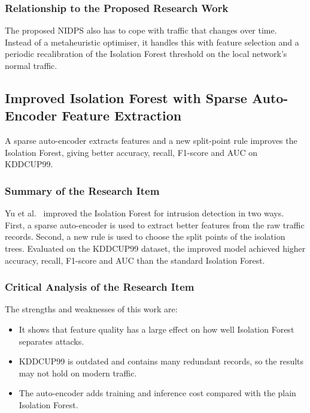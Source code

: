 \subsubsection{Relationship to the Proposed Research Work}\label{sec:3.2.9.3}

\noindent The proposed NIDPS also has to cope with traffic that changes over time. Instead of a metaheuristic optimiser, it handles this with feature selection and a periodic recalibration of the Isolation Forest threshold on the local network's normal traffic.

\subsection{Improved Isolation Forest with Sparse Auto-Encoder Feature Extraction}\label{sec:3.2.10}

\noindent A sparse auto-encoder extracts features and a new split-point rule improves the Isolation Forest, giving better accuracy, recall, F1-score and AUC on KDDCUP99.

\subsubsection{Summary of the Research Item}\label{sec:3.2.10.1}

\noindent Yu et al.~\cite{lr:yu2024} improved the Isolation Forest for intrusion detection in two ways. First, a sparse auto-encoder is used to extract better features from the raw traffic records. Second, a new rule is used to choose the split points of the isolation trees. Evaluated on the KDDCUP99 dataset, the improved model achieved higher accuracy, recall, F1-score and AUC than the standard Isolation Forest.

\subsubsection{Critical Analysis of the Research Item}\label{sec:3.2.10.2}

\noindent The strengths and weaknesses of this work are:

\begin{itemize}
\item It shows that feature quality has a large effect on how well Isolation Forest separates attacks.
\item KDDCUP99 is outdated and contains many redundant records, so the results may not hold on modern traffic.
\item The auto-encoder adds training and inference cost compared with the plain Isolation Forest.
\end{itemize}

